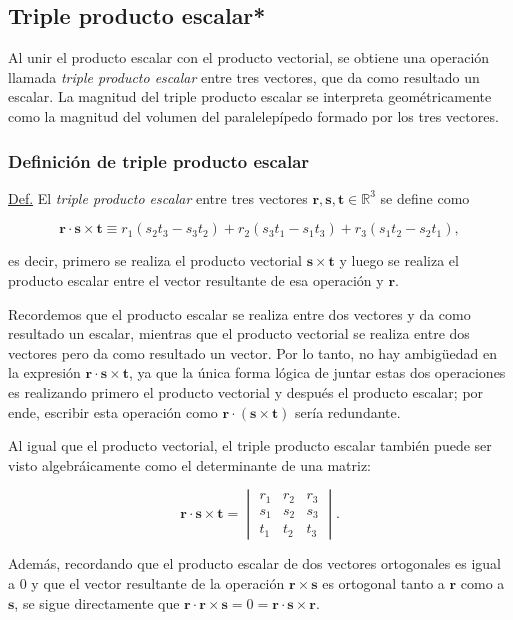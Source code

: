 \subsection{Triple producto escalar*}

Al unir el producto escalar con el producto vectorial, se obtiene una operación llamada \emph{triple producto escalar} entre tres vectores, que da como resultado un escalar. La magnitud del triple producto escalar se interpreta geométricamente como la magnitud del volumen del paralelepípedo formado por los tres vectores.

\subsubsection{Definición de triple producto escalar}
\begin{tcolorbox}
\underline{Def.} El \emph{triple producto escalar} entre tres vectores $\mathbf{r},\mathbf{s},\mathbf{t}\in\mathbb{R}^3$ se define como

$$\mathbf{r}\cdot\mathbf{s}\times\mathbf{t} \equiv r_1(s_2t_3-s_3t_2) + r_2(s_3t_1-s_1t_3) + r_3(s_1t_2-s_2t_1),$$

\noindent es decir, primero se realiza el producto vectorial $\mathbf{s}\times\mathbf{t}$ y luego se realiza el producto escalar entre el vector resultante de esa operación y $\mathbf{r}$.
\end{tcolorbox}

Recordemos que el producto escalar se realiza entre dos vectores y da como resultado un escalar, mientras que el producto vectorial se realiza entre dos vectores pero da como resultado un vector. Por lo tanto, no hay ambigüedad en la expresión $\mathbf{r}\cdot\mathbf{s}\times\mathbf{t}$, ya que la única forma lógica de juntar estas dos operaciones es realizando primero el producto vectorial y después el producto escalar; por ende, escribir esta operación como $\mathbf{r}\cdot(\mathbf{s}\times\mathbf{t})$ sería redundante.

Al igual que el producto vectorial, el triple producto escalar también puede ser visto algebráicamente como el determinante de una matriz:

$$\mathbf{r}\cdot\mathbf{s}\times\mathbf{t} = \begin{vmatrix} r_1&r_2&r_3 \\ s_1&s_2&s_3 \\ t_1&t_2&t_3 \end{vmatrix}.$$

    Además, recordando que el producto escalar de dos vectores ortogonales es igual a $0$ y que el vector resultante de la operación $\mathbf{r}\times\mathbf{s}$ es ortogonal tanto a $\mathbf{r}$ como a $\mathbf{s}$, se sigue directamente que $\mathbf{r}\cdot\mathbf{r}\times\mathbf{s}=0=\mathbf{r}\cdot\mathbf{s}\times\mathbf{r}$.



